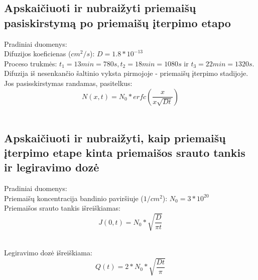 \documentclass[11pt,a4paper]{article}
\begin{document}
\subsection{Apskaičiuoti ir nubraižyti priemaišų pasiskirstymą po priemaišų įterpimo etapo}
Pradiniai duomenys:\\
Difuzijos koeficienas ($cm^2/s$): $D = 1.8*10^{-13}$\\
Proceso trukmės: $t_1 = 13min = 780s, t_2 = 18min = 1080s$ ir $t_3 = 22min = 1320s$.\\
Difuzija iš nesenkančio šaltinio vyksta pirmojoje - priemaišų įterpimo stadijoje. Jos pasisskirstymas randamas, pasitelkus:
\[N(x,t) = N_0*erfc \left( \frac{x}{x\sqrt{Dt}} \right) \] \\

\subsection{Apskaičiuoti ir nubraižyti, kaip priemaišų įterpimo etape kinta priemaišos srauto tankis ir legiravimo dozė}
Pradiniai duomenys:\\
Priemaišų koncentracija bandinio paviršiuje ($1/cm^2$): $N_0 = 3*10^{20}$\\
Priemaišos srauto tankis išreiškiamas:\\
\[J(0,t) = N_0*\sqrt{\frac{D}{\pi t}}\]
 \\

Legiravimo dozė išreiškiama:\\
\[Q(t) = 2*N_0*\sqrt{\frac{Dt}{\pi}}\]
 \\
\end{document}
